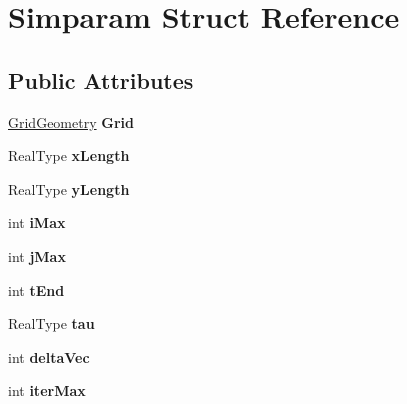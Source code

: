 \hypertarget{struct_simparam}{\section{Simparam Struct Reference}
\label{struct_simparam}
}
\subsection*{Public Attributes}
\begin{DoxyCompactItemize}
\item 
\hypertarget{struct_simparam_a01ce25eefaf4c1d155ca1701f19b55e7}{\hyperlink{struct_grid_geometry}{Grid\-Geometry} {\bfseries Grid}}\label{struct_simparam_a01ce25eefaf4c1d155ca1701f19b55e7}

\item 
\hypertarget{struct_simparam_a1e96889e108dde9f48978aa8f7c9027c}{Real\-Type {\bfseries x\-Length}}\label{struct_simparam_a1e96889e108dde9f48978aa8f7c9027c}

\item 
\hypertarget{struct_simparam_a065ce904080ea0361eae98124c86ffab}{Real\-Type {\bfseries y\-Length}}\label{struct_simparam_a065ce904080ea0361eae98124c86ffab}

\item 
\hypertarget{struct_simparam_a5f7e2ae23f38be14f693fb437058cdf5}{int {\bfseries i\-Max}}\label{struct_simparam_a5f7e2ae23f38be14f693fb437058cdf5}

\item 
\hypertarget{struct_simparam_ae52e9540a64a6e419554a7ebd77df83b}{int {\bfseries j\-Max}}\label{struct_simparam_ae52e9540a64a6e419554a7ebd77df83b}

\item 
\hypertarget{struct_simparam_a7fd229effd7842736783206b9f54707d}{int {\bfseries t\-End}}\label{struct_simparam_a7fd229effd7842736783206b9f54707d}

\item 
\hypertarget{struct_simparam_a09890730b950ccbd5df07ec0a6e7e0c5}{Real\-Type {\bfseries tau}}\label{struct_simparam_a09890730b950ccbd5df07ec0a6e7e0c5}

\item 
\hypertarget{struct_simparam_a695c2c299b4c8a474fdb76a85efdff81}{int {\bfseries delta\-Vec}}\label{struct_simparam_a695c2c299b4c8a474fdb76a85efdff81}

\item 
\hypertarget{struct_simparam_a0a20db5558bc0fc25e3431e04171312c}{int {\bfseries iter\-Max}}\label{struct_simparam_a0a20db5558bc0fc25e3431e04171312c}


\end{DoxyCompactItemize}
